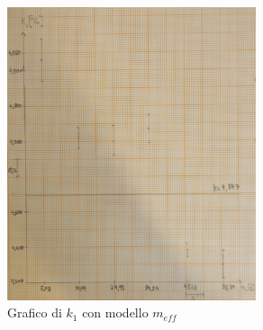 \documentclass[a4paper]{article}
\begin{document}
{\begin{figure}[!ht]
    \centering
    \includegraphics[width=0.65\textwidth]{fotomolla/Molla 1/m1dinamico_mefficace.jpg}
    \caption{Grafico di $k_1$ con modello $m_{eff}$}
\end{figure}
\FloatBarrier

}
\end{document}
